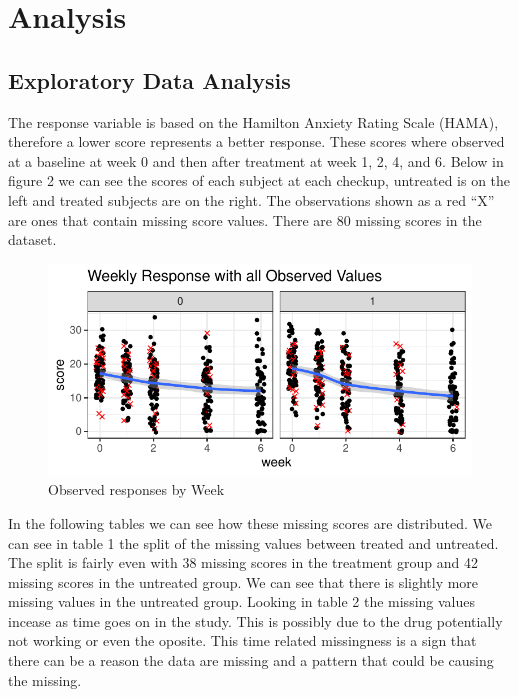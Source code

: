 \documentclass[
]{article}
\begin{document}
\section{Analysis}\label{analysis}

\subsection{Exploratory Data Analysis}\label{exploratory-data-analysis}

The response variable is based on the Hamilton Anxiety Rating Scale
(HAMA), therefore a lower score represents a better response. These
scores where observed at a baseline at week 0 and then after treatment
at week 1, 2, 4, and 6. Below in figure 2 we can see the scores of each
subject at each checkup, untreated is on the left and treated subjects
are on the right. The observations shown as a red ``X'' are ones that
contain missing score values. There are 80 missing scores in the
dataset.

\begin{figure}

{\centering \includegraphics{missingness_in_causal_inference_files/figure-latex/unnamed-chunk-1-1} 

}

\caption{Observed responses by Week}\label{fig:unnamed-chunk-1}
\end{figure}

In the following tables we can see how these missing scores are
distributed. We can see in table 1 the split of the missing values
between treated and untreated. The split is fairly even with 38 missing
scores in the treatment group and 42 missing scores in the untreated
group. We can see that there is slightly more missing values in the
untreated group. Looking in table 2 the missing values incease as time
goes on in the study. This is possibly due to the drug potentially not
working or even the oposite. This time related missingness is a sign
that there can be a reason the data are missing and a pattern that could
be causing the missing.
\end{document}
